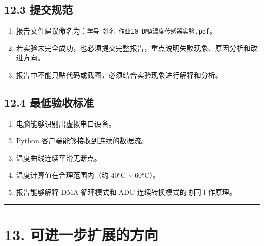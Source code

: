 \documentclass[
  chinese,
  UTF8,
  oneside,
  openany]{ctexbook}
\providecommand{\tightlist}{%
  \setlength{\itemsep}{0pt}\setlength{\parskip}{0pt}}
\begin{document}
\subsection{12.3 提交规范}\label{ux63d0ux4ea4ux89c4ux8303-5}

\begin{enumerate}
\def\labelenumi{\arabic{enumi}.}
\tightlist
\item
  报告文件建议命名为：\texttt{学号-姓名-作业10-DMA温度传感器实验.pdf}。
\item
  若实验未完全成功，也必须提交完整报告，重点说明失败现象、原因分析和改进方向。
\item
  报告中不能只贴代码或截图，必须结合实验现象进行解释和分析。
\end{enumerate}

\subsection{12.4
最低验收标准}\label{ux6700ux4f4eux9a8cux6536ux6807ux51c6-5}

\begin{enumerate}
\def\labelenumi{\arabic{enumi}.}
\tightlist
\item
  电脑能够识别出虚拟串口设备。
\item
  Python 客户端能够接收到连续的数据流。
\item
  温度曲线连续平滑无断点。
\item
  温度计算值在合理范围内（约 40°C \textasciitilde{} 60°C）。
\item
  报告能够解释 DMA 循环模式和 ADC 连续转换模式的协同工作原理。
\end{enumerate}

\begin{center}\rule{0.5\linewidth}{0.5pt}\end{center}

\section{13.
可进一步扩展的方向}\label{ux53efux8fdbux4e00ux6b65ux6269ux5c55ux7684ux65b9ux5411-2}
\end{document}

